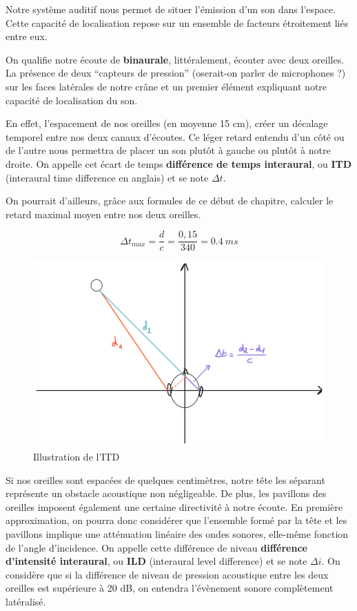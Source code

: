 \documentclass[
]{book}
\begin{document}
Notre système auditif nous permet de situer l'émission d'un son dans l'espace. Cette capacité de localisation repose sur un ensemble de facteurs étroitement liés entre eux.

On qualifie notre écoute de \textbf{binaurale}, littéralement, écouter avec deux oreilles. La présence de deux ``capteurs de pression'' (oserait-on parler de microphones ?) sur les faces latérales de notre crâne et un premier élément expliquant notre capacité de localisation du son.

En effet, l'espacement de nos oreilles (en moyenne 15 cm), créer un décalage temporel entre nos deux canaux d'écoutes. Ce léger retard entendu d'un côté ou de l'autre nous permettra de placer un son plutôt à gauche ou plutôt à notre droite. On appelle cet écart de temps \textbf{différence de temps interaural}, ou \textbf{ITD} (interaural time difference en anglais) et se note \(\Delta t\).

On pourrait d'ailleurs, grâce aux formules de ce début de chapitre, calculer le retard maximal moyen entre nos deux oreilles.

\[\Delta t_{max} = \frac d c = \frac {0,15}{340} = 0.4 \> ms\]

\begin{figure}

{\centering \includegraphics{_resources/drawings/delta_t} 

}

\caption{Illustration de l'ITD}\label{fig:unnamed-chunk-9}
\end{figure}

Si nos oreilles sont espacées de quelques centimètres, notre tête les séparant représente un obstacle acoustique non négligeable. De plus, les pavillons des oreilles imposent également une certaine directivité à notre écoute. En première approximation, on pourra donc considérer que l'ensemble formé par la tête et les pavillons implique une atténuation linéaire des ondes sonores, elle-même fonction de l'angle d'incidence. On appelle cette différence de niveau \textbf{différence d'intensité interaural}, ou \textbf{ILD} (interaural level difference) et se note \(\Delta i\). On considère que si la différence de niveau de pression acoustique entre les deux oreilles est supérieure à 20 dB, on entendra l'évènement sonore complètement latéralisé.
\end{document}
